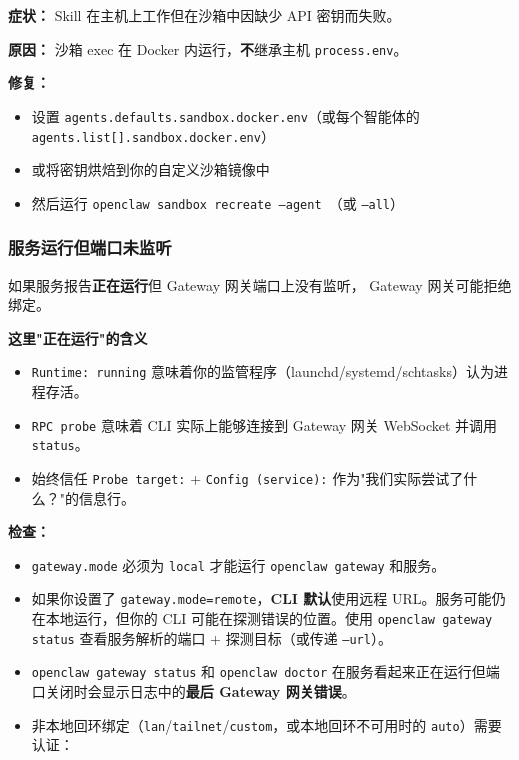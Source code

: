 \textbf{症状：} Skill 在主机上工作但在沙箱中因缺少 API 密钥而失败。

\textbf{原因：} 沙箱 exec 在 Docker 内运行，\textbf{不}继承主机 \texttt{process.env}。

\textbf{修复：}

\begin{itemize}
  \item 设置 \texttt{agents.defaults.sandbox.docker.env}（或每个智能体的 \texttt{agents.list[].sandbox.docker.env}）
  \item 或将密钥烘焙到你的自定义沙箱镜像中
  \item 然后运行 \texttt{openclaw sandbox recreate --agent }（或 \texttt{--all}）
\end{itemize}


\subsubsection{服务运行但端口未监听}


如果服务报告\textbf{正在运行}但 Gateway 网关端口上没有监听，
Gateway 网关可能拒绝绑定。

\textbf{这里"正在运行"的含义}

\begin{itemize}
  \item \texttt{Runtime: running} 意味着你的监管程序（launchd/systemd/schtasks）认为进程存活。
  \item \texttt{RPC probe} 意味着 CLI 实际上能够连接到 Gateway 网关 WebSocket 并调用 \texttt{status}。
  \item 始终信任 \texttt{Probe target:} + \texttt{Config (service):} 作为"我们实际尝试了什么？"的信息行。
\end{itemize}


\textbf{检查：}

\begin{itemize}
  \item \texttt{gateway.mode} 必须为 \texttt{local} 才能运行 \texttt{openclaw gateway} 和服务。
  \item 如果你设置了 \texttt{gateway.mode=remote}，\textbf{CLI 默认}使用远程 URL。服务可能仍在本地运行，但你的 CLI 可能在探测错误的位置。使用 \texttt{openclaw gateway status} 查看服务解析的端口 + 探测目标（或传递 \texttt{--url}）。
  \item \texttt{openclaw gateway status} 和 \texttt{openclaw doctor} 在服务看起来正在运行但端口关闭时会显示日志中的\textbf{最后 Gateway 网关错误}。
  \item 非本地回环绑定（\texttt{lan}/\texttt{tailnet}/\texttt{custom}，或本地回环不可用时的 \texttt{auto}）需要认证：
\end{itemize}

